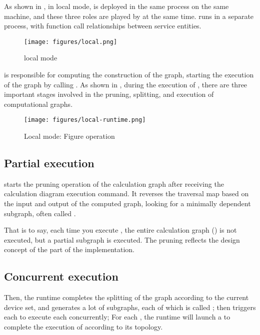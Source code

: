 \begin{content}

As shown in , in local mode,  is deployed in the same process on the same machine, and these three roles are played by  at the same time.  runs in a separate process, with function call relationships between service entities.

\begin{figure}[H]
\centering
\texttt{[image: figures/local.png]}
\caption{local mode}
 \label{fig:local}
\end{figure}

 is responsible for computing the construction of the graph, starting the execution of the graph by calling . As shown in , during the execution of , there are three important stages involved in the pruning, splitting, and execution of computational graphs.

\begin{figure}[H]
\centering
\texttt{[image: figures/local-runtime.png]}
\caption{Local mode: Figure operation}
 \label{fig:local-runtime}
\end{figure}

\subsection{Partial execution}

 starts the pruning operation of the calculation graph after receiving the calculation diagram execution command. It reverses the traversal map based on the input and output of the computed graph, looking for a minimally dependent subgraph, often called .

That is to say, each time you execute , the entire calculation graph () is not executed, but a partial subgraph is executed. The pruning reflects the design concept of the \tf{} part of the implementation.

\subsection{Concurrent execution}

Then, the runtime completes the splitting of the graph according to the current device set, and generates a lot of subgraphs, each of which is called ; then triggers each  to execute each  concurrently; For each , the runtime will launch a  to complete the execution of  according to its topology.


\end{content}
